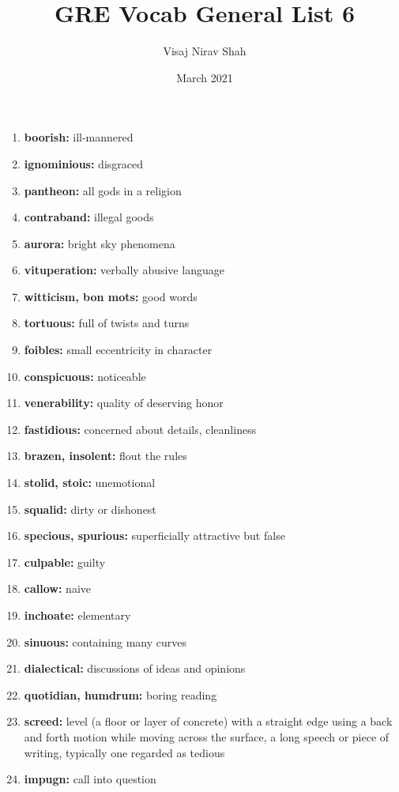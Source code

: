 \documentclass{article}
\title{\textbf{GRE Vocab General List 6}}
\author{Visaj Nirav Shah}
\date{March 2021}
\begin{document}
\maketitle

\begin{enumerate}
    \item \textbf{boorish: }{ill-mannered}
    \item \textbf{ignominious: }{disgraced}
    \item \textbf{pantheon: }{all gods in a religion}
    \item \textbf{contraband: }{illegal goods}
    \item \textbf{aurora: }{bright sky phenomena}
    \item \textbf{vituperation: }{verbally abusive language}
    \item \textbf{witticism, bon mots: }{good words}
    \item \textbf{tortuous: }{full of twists and turns}
    \item \textbf{foibles: }{small eccentricity in character}
    \item \textbf{conspicuous: }{noticeable}
    \item \textbf{venerability: }{quality of deserving honor}
    \item \textbf{fastidious: }{concerned about details, cleanliness}
    \item \textbf{brazen, insolent: }{flout the rules}
    \item \textbf{stolid, stoic: }{unemotional}
    \item \textbf{squalid: }{dirty or dishonest}
    \item \textbf{specious, spurious: }{superficially attractive but false}
    \item \textbf{culpable: }{guilty}
    \item \textbf{callow: }{naive}
    \item \textbf{inchoate: }{elementary}
    \item \textbf{sinuous: }{containing many curves}
    \item \textbf{dialectical: }{discussions of ideas and opinions}
    \item \textbf{quotidian, humdrum: }{boring reading}
    \item \textbf{screed: }{level (a floor or layer of concrete) with a straight edge using a back and forth motion while moving across the surface, a long speech or piece of writing, typically one regarded as tedious}
    \item \textbf{impugn: }{call into question}

\end{enumerate}
\end{document}
